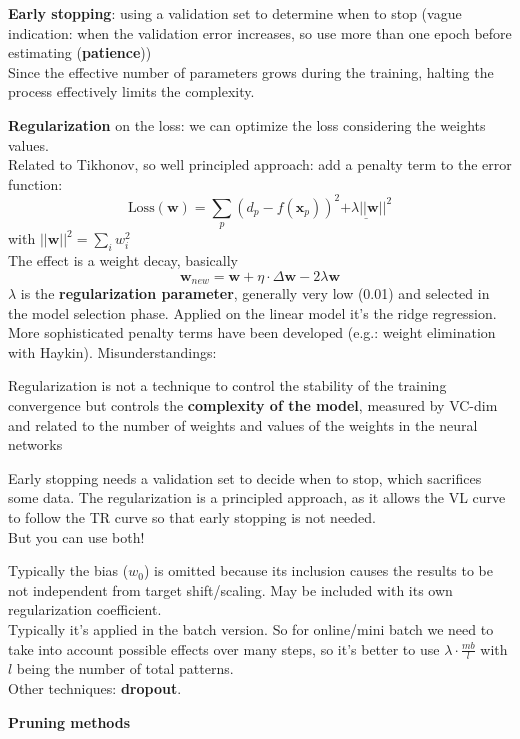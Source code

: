 \documentclass[10pt]{report}
\begin{document}
\begin{list}{}{}
	\item \textbf{Early stopping}: using a validation set to determine when to stop (vague indication: when the validation error increases, so use more than one epoch before estimating (\textbf{patience}))\\
	Since the effective number of parameters grows during the training, halting the process effectively limits the complexity.
	\item \textbf{Regularization} on the loss: we can optimize the loss considering the weights values.\\
	Related to Tikhonov, so well principled approach: add a penalty term to the error function: $$\text{Loss}(\mathbf{w}) = \sum_p (d_p - f(\mathbf{x}_p))^2 \underline{+\lambda||\mathbf{w}||^2}$$ with $||\mathbf{w}||^2 = \sum_i w_i^2$\\
	The effect is a weight decay, basically $$\mathbf{w}_{new} = \mathbf{w} + \eta\cdot\Delta \mathbf{w} - 2\lambda \mathbf{w}$$
	$\lambda$ is the \textbf{regularization parameter}, generally very low (0.01) and selected in the model selection phase. Applied on the linear model it's the ridge regression.\\
	More sophisticated penalty terms have been developed (e.g.: weight elimination with Haykin).
	Misunderstandings:
	\begin{list}{}{}
		\item Regularization is not a technique to control the stability of the training convergence but controls the \textbf{complexity of the model}, measured by VC-dim and related to the number of weights and values of the weights in the neural networks
		\item Early stopping needs a validation set to decide when to stop, which sacrifices some data. The regularization is a principled approach, as it allows the VL curve to follow the TR curve so that early stopping is not needed.\\
		But you can use both!
	\end{list}
	Typically the bias ($w_0$) is omitted because its inclusion causes the results to be not independent from target shift/scaling. May be included with its own regularization coefficient.\\
	Typically it's applied in the batch version. So for online/mini batch we need to take into account possible effects over many steps, so it's better to use $\lambda\cdot\frac{mb}{l}$ with $l$ being the number of total patterns.\\
	Other techniques: \textbf{dropout}.
	\item \textbf{Pruning methods}
\end{list}
\end{document}
